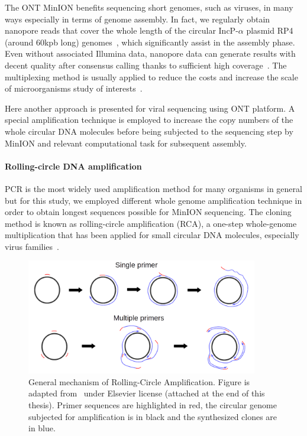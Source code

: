 The ONT MinION benefits sequencing short genomes, such as viruses, in many ways especially in terms of genome assembly. 
In fact, we regularly obtain nanopore reads that cover the whole length of the circular IncP-$\alpha$ plasmid RP4 (around $60$kpb long) genomes~\cite{Lu2018plamids}, which significantly assist in the assembly phase.   
Even without associated Illumina data, nanopore data can generate results with decent quality after consensus calling thanks to sufficient high coverage~\cite{Vaser2017racon}.
The multiplexing method is usually applied to reduce the costs and increase the scale of microorganisms study of interests~\cite{Quick2017GP}.

Here another approach is presented for viral sequencing using ONT platform. A special amplification technique is employed to increase the copy numbers of the whole circular DNA molecules before being subjected to the sequencing step by MinION and relevant computational task for subsequent assembly.

\paragraph{Rolling-circle DNA amplification}
PCR is the most widely used amplification method for many organisms in general but for this study, we employed different whole genome amplification technique in order to obtain longest sequences possible for MinION sequencing.
The cloning method is known as rolling-circle amplification (RCA), a one-step whole-genome multiplication that has been applied for small circular DNA molecules, especially virus families~\cite{Rector2004rca14,Inoue2004rca28,Schubert2007rca30,Knierim200rca31,Shepherd2008rca32,Haible2006rca33,Homs2008rca34}.

\begin{figure}[!hpt]
\centerline{\includegraphics[width=0.9\textwidth]{images/rca.png}}
\caption[Rolling Circle Amplification]{General mechanism of Rolling-Circle Amplification. Figure is adapted from~\cite{Johne2009rca} under Elsevier license (attached at the end of this thesis). Primer sequences are highlighted in red, the circular genome subjected for amplification is in black and the synthesized clones are in blue.}
\label{fig:concat_rca}
\end{figure}

